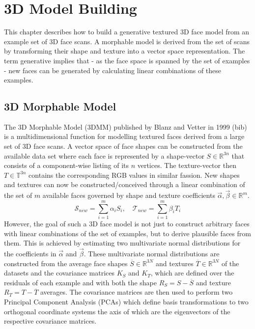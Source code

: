 \chapter{3D Model Building}
This chapter describes how to build a generative textured 3D face model from an example set of 3D face scans. A morphable model is derived from the set of scans by transforming their shape and texture into a vector space representation. The term generative implies that - as the face space is spanned by the set of examples - new faces can be generated by calculating linear combinations of these examples. 

\section{3D Morphable Model}
The 3D Morphable Model (3DMM) published by Blanz and Vetter in 1999 (bib) is a multidimensional function for modelling textured faces derived from a large set of 3D face scans. 
A vector space of face shapes can be constructed from the available data set where each face is represented by a shape-vector $S \in \mathbb{R}^{3n}$ that consists of a component-wise listing of its $n$ vertices. The texture-vector then $T \in
\mathbb{T}^{3n}$ contains the corresponding RGB values in similar fassion.
New shapes and textures can now be constructed/conceived through a linear combination of the set of $m$ available faces governed by shape and texture coefficients $\vec\alpha, \vec\beta \in \mathbb{R}^{m}$.
\begin{equation}
\label{eq:MM}
\mathcal{S}_{new}=\sum_{i=1}^{m}\alpha_{i}S_{i}, \quad \mathcal{T}_{new}=\sum_{i=1}^{m}\beta_{i}T_{i}
\end{equation}
However, the goal of such a 3D face model is not just to construct arbitrary faces with linear combinations of the set of examples, but to derive plausible faces from them. This is achieved by estimating two multivariate normal distributions for the coefficients in $\vec\alpha$ and $\vec\beta$.
These multivariate normal distributions are constructed from the average face shapes $\overline{S} \in \mathbb{R}^{3N}$ and textures $\overline{T} \in \mathbb{R}^{3N}$ of the datasets and the covariance matrices $K_{S}$ and $K_{T}$, which are defined over the residuals of each example and with both the shape $R_{S}=S-\overline{S}$ and texture $R_{T}=T-\overline{T}$ averages. The covariance matrices are then used to perform two Principal Component Analysis (PCAs)
which define basis transformations to two orthogonal coordinate systems the axis of which are the eigenvectors of the respective covariance matrices.
